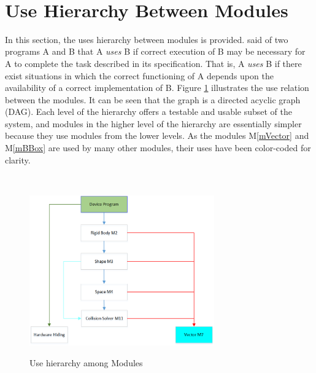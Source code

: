 \documentclass[12pt]{article}
\begin{document}
~\newpage

\section{Use Hierarchy Between Modules} \label{SecUse}

In this section, the uses hierarchy between modules is
provided. \citet{Parnas1978} said of two programs A and B that A {\em uses} B if correct execution of B may be necessary for A to complete the task described in its specification. That is, A {\em uses} B if there exist situations in which the correct functioning of A depends upon the availability of a correct implementation of B.  Figure \ref{Fig_uses} illustrates the use relation between the modules. It can be seen that the graph is a directed acyclic graph (DAG). Each level of the hierarchy offers a testable and usable subset of the system, and modules in the higher level of the hierarchy are essentially simpler because they use modules from the lower levels. As the modules M\ref{mVector} and M\ref{mBBox} are used by many other modules, their uses have been color-coded for clarity.

~\newpage
\begin{figure}[htbp]
\begin{center}
{
 \includegraphics[width=0.71\textwidth]{uses1}
}
\caption{\label{Fig_uses}Use hierarchy among Modules}
\end{center}
\end{figure}
\end{document}
